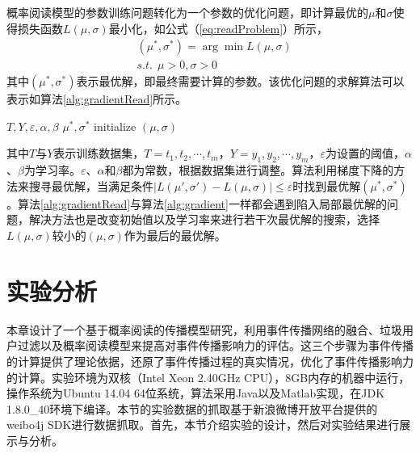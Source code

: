 概率阅读模型的参数训练问题转化为一个参数的优化问题，即计算最优的$\mu$和$\sigma$使得损失函数$L\left(\mu, \sigma \right)$最小化，如公式（\ref{eq:readProblem}）所示，
\begin{equation}
\label{eq:readProblem}
    \begin{split}
        &\left(\mu^{\ast},\sigma^{\ast}\right) = \arg\min{L\left(\mu, \sigma \right)}\\
        &s.t.~~\mu > 0, \sigma > 0
    \end{split}
\end{equation}
其中$\left(\mu^{\ast},\sigma^{\ast}\right)$表示最优解，即最终需要计算的参数。该优化问题的求解算法可以表示如算法\ref{alg:gradientRead}所示。
\begin{algorithm}[!ht]
	\caption{$Gradient(T,Y)$}
	\label{alg:gradientRead}
	\begin{algorithmic}[1]
	\REQUIRE $T,Y,\varepsilon,\alpha,\beta$
	\ENSURE $\mu^{\ast},\sigma^{\ast}$
	\STATE initialize $\left(\mu,\sigma\right)$
	\ENDWHILE
    \end{algorithmic}
\end{algorithm}

其中$T$与$Y$表示训练数据集，$T={t_1,t_2,\cdots,t_m}$，$Y={y_1,y_2,\cdots,y_m}$，$\varepsilon$为设置的阈值，$\alpha$、$\beta$为学习率。$\varepsilon$、$\alpha$和$\beta$都为常数，根据数据集进行调整。算法利用梯度下降的方法来搜寻最优解，当满足条件$\vert L\left({\mu}',{\sigma}'\right) - L\left(\mu, \sigma \right)\vert \leq \varepsilon$时找到最优解$\left(\mu^{\ast},\sigma^{\ast}\right)$。算法\ref{alg:gradientRead}与算法\ref{alg:gradient}一样都会遇到陷入局部最优解的问题，解决方法也是改变初始值以及学习率来进行若干次最优解的搜索，选择$L\left(\mu, \sigma \right)$较小的$\left(\mu,\sigma\right)$作为最后的最优解。
\section{实验分析}
\label{sec5:experiment}
本章设计了一个基于概率阅读的传播模型研究，利用事件传播网络的融合、垃圾用户过滤以及概率阅读模型来提高对事件传播影响力的评估。这三个步骤为事件传播的计算提供了理论依据，还原了事件传播过程的真实情况，优化了事件传播影响力的计算。实验环境为双核（Intel Xeon 2.40GHz CPU），8GB内存的机器中运行，操作系统为Ubuntu 14.04 64位系统，算法采用Java以及Matlab实现，在JDK 1.8.0\_40环境下编译。本节的实验数据的抓取基于新浪微博开放平台提供的weibo4j SDK进行数据抓取。首先，本节介绍实验的设计，然后对实验结果进行展示与分析。

